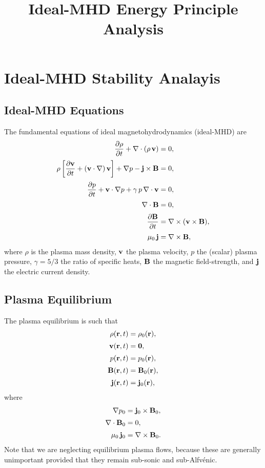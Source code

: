 \documentclass[12pt,prb,aps,notitlepage]{revtex4-1}
\begin{document}
\title{Ideal-MHD Energy Principle Analysis}
\maketitle

\section{Ideal-MHD Stability Analayis}
\subsection{Ideal-MHD Equations}
The fundamental  equations of ideal magnetohydrodynamics (ideal-MHD) are
\begin{align}
\frac{\partial\rho}{\partial t} + \nabla\cdot(\rho\,{\bf v}) & =0,\label{e1}\\[0.5ex]
\rho\left[\frac{\partial{\bf v}}{\partial t} + ({\bf v}\cdot\nabla)\,{\bf v}\right]+\nabla p - {\bf j}\times {\bf B}&=0,\label{e2}\\[0.5ex]
\frac{\partial p}{\partial t}+{\bf v}\cdot\nabla p + \gamma\,p\,\nabla\cdot{\bf v} &=0,\label{e3}\\[0.5ex]
\nabla\cdot{\bf B} &=0,\\[0.5ex]
\frac{\partial {\bf B}}{\partial t} &= \nabla\times({\bf v}\times {\bf B}),\label{e4}\\[0.5ex]
\mu_0\,{\bf j} &= \nabla\times {\bf B},\label{e5}
\end{align}
where $\rho$ is the plasma mass density, ${\bf v}$ the plasma velocity, $p$ the (scalar) plasma pressure, $\gamma=5/3$ the ratio of specific heats,
${\bf B}$ the magnetic field-strength, and ${\bf j}$ the electric current density. 

\subsection{Plasma Equilibrium}
The plasma equilibrium is such that
\begin{align}
\rho({\bf r},t) &= \rho_0({\bf r}),\\[0.5ex]
{\bf v}({\bf r},t) &= {\bf 0},\label{e7}\\[0.5ex]
p({\bf r},t) &= p_0({\bf r}),\\[0.5ex]
{\bf B}({\bf r},t) &= {\bf B}_0({\bf r}),\\[0.5ex]
{\bf j}({\bf r},t) &= {\bf j}_0({\bf r}),
\end{align}
where
\begin{align}
\nabla p_0 &= {\bf j}_0\times {\bf B}_0,\label{e11}\\[0.5ex]
\nabla\cdot{\bf B}_0&= 0,\label{e6}\\[0.5ex]
\mu_0\,{\bf j}_0 &= \nabla\times {\bf B}_0.\label{e12}
\end{align}
Note that we are neglecting equilibrium plasma flows, because these are generally unimportant provided that they remain sub-sonic and sub-Alfv\'{e}nic. 
\end{document}
